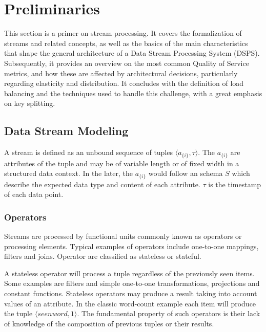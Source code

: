 \chapter{Preliminaries
  \label{chapter:preliminaries}}

  This section is a primer on stream processing. It covers the formalization of
  streams and related concepts, as well as the basics of the main
  characteristics that shape the general architecture of a Data Stream
  Processing System (DSPS). Subsequently, it provides an overview on the most
  common Quality of Service metrics, and how these are affected by
  architectural decisions, particularly regarding elasticity and distribution.
  It concludes with the definition of load balancing and the techniques used to
  handle this challenge, with a great emphasis on key splitting.

  \section{Data Stream Modeling}

  A stream is defined as an unbound sequence of tuples $\langle
  a_{\{i\}},\tau\rangle$. The $a_{\{i\}}$ are attributes of the tuple and may
  be of variable length or of fixed width in a structured data context. In the
  later, the $a_{\{i\}}$ would follow an schema $S$ which describe the expected
  data type and  content of each attribute. $\tau$ is the timestamp of each
  data point.

  \subsection{Operators}

  Streams are processed by functional units commonly known as operators or
  processing elements. Typical examples of operators include one-to-one
  mappings, filters and joins. Operator are classified as stateless or
  stateful.

  A stateless operator will process a tuple regardless of the previously seen
  items. Some examples are filters and simple one-to-one transformations,
  projections and constant functions. Stateless operators may produce a result
  taking into account values of an attribute. In the classic word-count example
  each item will produce the tuple $\langle seenword, 1\rangle$. The
  fundamental property of such operators is their lack of knowledge of the
  composition of previous tuples or their results.

